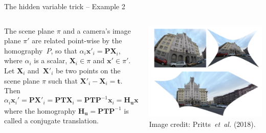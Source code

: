 \documentclass[aspectratio=169]{beamer}
\makeatletter
\newcommand{\etal}{\emph{et~al.}}
\newcommand{\mat}[1]{\bm{#1}}
\DeclareRobustCommand\etal{\emph{et~al}\@ifnextchar.{}{.\@}}
\makeatother
\begin{document}
\def\hiddenvariableTwoeHeight{\vspace{4mm}}
\begin{frame}[t]{The hidden variable trick -- Example 2}
\begin{columns}
    \begin{column}{0.5\textwidth}
        \begin{minipage}[t][\textheight][t]{\textwidth}
        \hiddenvariableTwoeHeight
        The scene plane $\pi$ and a camera's image plane $\pi'$ are related point-wise by the
        homography~$P$, so that $\alpha_i\mat{x}'_i=\mat{PX}_i$, where $\alpha_i$ is a scalar,
        $\mat{X}_i\in\pi$ and $\mat{x}'\in\pi'$. Let $\mat{X}_i$ and~$\mat{X}'_i$ be two points on the
        scene plane $\pi$ such that $\mat{X}'_i -\mat{X}_i=\mat{t}$. Then
        \begin{equation*}
            \alpha_i\mat{x}_i' = \mat{PX}'_i = \mat{PTX}_i = \mat{PTP}^{-1}\mat{x}_i=\mat{H_ux}_i,
        \end{equation*}
        where the homography $\mat{H_u}=\mat{PTP}^{-1}$ is called a conjugate translation.
        \end{minipage}
    \end{column}%
    \begin{column}{0.5\textwidth}
        \centering
        \includegraphics[width=\linewidth]{images/conjugate_trans.png}
        {\scriptsize Image credit: Pritts~\etal{} (2018).}
    \end{column}
\end{columns}
\end{frame}
\end{document}
